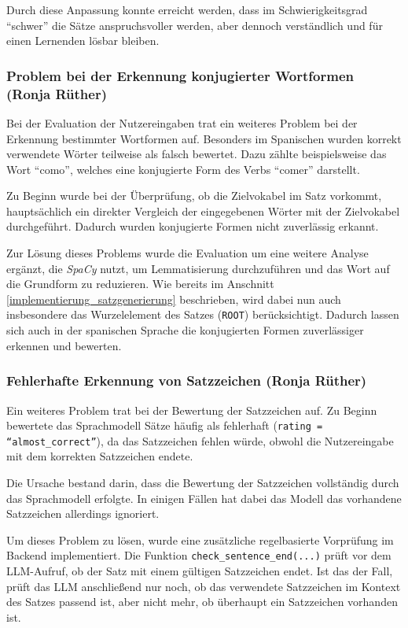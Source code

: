 Durch diese Anpassung konnte erreicht werden, dass im Schwierigkeitsgrad \enquote{schwer} die Sätze anspruchsvoller werden, aber 
dennoch verständlich und für einen Lernenden lösbar bleiben.

\subsubsection{Problem bei der Erkennung konjugierter Wortformen (Ronja Rüther)}
Bei der Evaluation der Nutzereingaben trat ein weiteres Problem bei der Erkennung bestimmter Wortformen auf.
Besonders im Spanischen wurden korrekt verwendete Wörter teilweise als falsch bewertet. Dazu zählte beispielsweise das 
Wort \enquote{como}, welches eine konjugierte Form des Verbs \enquote{comer} darstellt.

Zu Beginn wurde bei der Überprüfung, ob die Zielvokabel im Satz vorkommt, hauptsächlich ein direkter Vergleich der eingegebenen Wörter mit der Zielvokabel durchgeführt.
Dadurch wurden konjugierte Formen nicht zuverlässig erkannt.

Zur Lösung dieses Problems wurde die Evaluation um eine weitere Analyse ergänzt, die \textit{SpaCy} nutzt, um Lemmatisierung durchzuführen und das Wort auf die Grundform zu reduzieren.
Wie bereits im Anschnitt \ref{implementierung_satzgenerierung} beschrieben, wird dabei nun auch insbesondere das Wurzelelement des Satzes (\texttt{ROOT}) berücksichtigt.
Dadurch lassen sich auch in der spanischen Sprache die konjugierten Formen zuverlässiger erkennen und bewerten.

\subsubsection{Fehlerhafte Erkennung von Satzzeichen (Ronja Rüther)}
Ein weiteres Problem trat bei der Bewertung der Satzzeichen auf. Zu Beginn bewertete das Sprachmodell Sätze häufig als fehlerhaft (\texttt{rating = \enquote{almost\_correct}}), 
da das Satzzeichen fehlen würde, obwohl die Nutzereingabe mit dem korrekten Satzzeichen endete.

Die Ursache bestand darin, dass die Bewertung der Satzzeichen vollständig durch das Sprachmodell erfolgte. In einigen Fällen hat dabei das Modell das vorhandene Satzzeichen allerdings ignoriert.

Um dieses Problem zu lösen, wurde eine zusätzliche regelbasierte Vorprüfung im Backend implementiert.
Die Funktion \texttt{check\_sentence\_end(...)} prüft vor dem LLM-Aufruf, ob der Satz mit einem gültigen Satzzeichen endet.
Ist das der Fall, prüft das LLM anschließend nur noch, ob das verwendete Satzzeichen im Kontext des Satzes passend ist, aber nicht mehr, ob überhaupt ein Satzzeichen vorhanden ist. 

